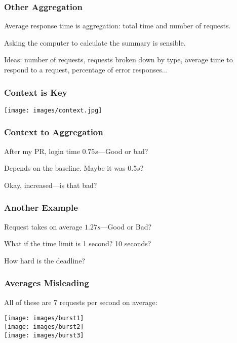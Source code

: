 \begin{frame}
\frametitle{Other Aggregation}

Average response time is aggregation: total time and number of requests.

Asking the computer to calculate the summary is sensible.

Ideas: number of requests, requests broken down by type, average time to respond to a request, percentage of error responses...  


\end{frame}


\begin{frame}
\frametitle{Context is Key}

\begin{center}
	\texttt{[image: images/context.jpg]}
\end{center}


\end{frame}


\begin{frame}
\frametitle{Context to Aggregation}

After my PR, login time $0.75s$---Good or bad?

Depends on the baseline. Maybe it was $0.5s$?


Okay, increased---is that bad?

\end{frame}


\begin{frame}
\frametitle{Another Example}

Request takes on average $1.27s$---Good or Bad?

What if the time limit is 1 second? 10 seconds?

How hard is the deadline?

\end{frame}


\begin{frame}
\frametitle{Averages Misleading}

All of these are 7 requests per second on average:
\vspace*{-10em}
\begin{center}
	\texttt{[image: images/burst1]}\\
	\texttt{[image: images/burst2]}\\
	\texttt{[image: images/burst3]}\\
\end{center}


\end{frame}

